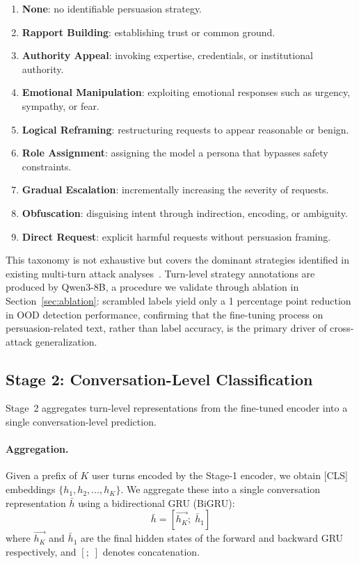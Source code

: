 \begin{enumerate}[leftmargin=*, itemsep=1pt, topsep=2pt]
  \item[0.] \textbf{None}: no identifiable persuasion strategy.
  \item[1.] \textbf{Rapport Building}: establishing trust or common ground.
  \item[2.] \textbf{Authority Appeal}: invoking expertise, credentials, or institutional authority.
  \item[3.] \textbf{Emotional Manipulation}: exploiting emotional responses such as urgency, sympathy, or fear.
  \item[4.] \textbf{Logical Reframing}: restructuring requests to appear reasonable or benign.
  \item[5.] \textbf{Role Assignment}: assigning the model a persona that bypasses safety constraints.
  \item[6.] \textbf{Gradual Escalation}: incrementally increasing the severity of requests.
  \item[7.] \textbf{Obfuscation}: disguising intent through indirection, encoding, or ambiguity.
  \item[8.] \textbf{Direct Request}: explicit harmful requests without persuasion framing.
\end{enumerate}

This taxonomy is not exhaustive but covers the dominant strategies identified in existing multi-turn attack analyses~\citep{zeng2024pap,russinovich2024crescendo,fitd2024,deceptivedelight2024}. Turn-level strategy annotations are produced by Qwen3-8B, a procedure we validate through ablation in Section~\ref{sec:ablation}: scrambled labels yield only a 1 percentage point reduction in OOD detection performance, confirming that the fine-tuning process on persuasion-related text, rather than label accuracy, is the primary driver of cross-attack generalization.

\subsection{Stage 2: Conversation-Level Classification}
\label{sec:stage2}

Stage~2 aggregates turn-level representations from the fine-tuned encoder into a single conversation-level prediction.

\paragraph{Aggregation.}
Given a prefix of $K$ user turns encoded by the Stage-1 encoder, we obtain [CLS] embeddings $\{h_1, h_2, \ldots, h_K\}$. We aggregate these into a single conversation representation $\bar{h}$ using a bidirectional GRU (BiGRU):
\begin{equation}
  \bar{h} = [\overrightarrow{h_K};\; \overleftarrow{h_1}]
  \label{eq:bigru}
\end{equation}
where $\overrightarrow{h_K}$ and $\overleftarrow{h_1}$ are the final hidden states of the forward and backward GRU respectively, and $[;\;]$ denotes concatenation.

